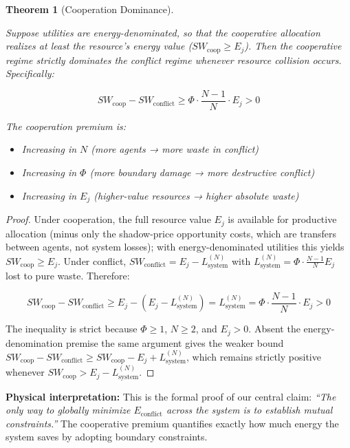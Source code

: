 \documentclass[11pt]{article}
\theoremstyle{plain}
\newtheorem{theorem}{Theorem}
\theoremstyle{definition}
\theoremstyle{remark}
\begin{document}
\begin{theorem}[Cooperation Dominance]
\label{thm-cooperation-dominance}

Suppose utilities are energy-denominated, so that the cooperative allocation realizes at least the resource's energy value ($SW_{\text{coop}} \geq E_j$). Then the cooperative regime strictly dominates the conflict regime whenever resource collision occurs. Specifically:

$$SW_{\text{coop}} - SW_{\text{conflict}} \geq \Phi \cdot \frac{N-1}{N} \cdot E_j > 0$$

The cooperation premium is:
\begin{itemize}
\item Increasing in $N$ (more agents → more waste in conflict)
\item Increasing in $\Phi$ (more boundary damage → more destructive conflict)
\item Increasing in $E_j$ (higher-value resources → higher absolute waste)
\end{itemize}

\end{theorem}

\begin{proof}
Under cooperation, the full resource value $E_j$ is available for productive allocation (minus only the shadow-price opportunity costs, which are transfers between agents, not system losses); with energy-denominated utilities this yields $SW_{\text{coop}} \geq E_j$. Under conflict, $SW_{\text{conflict}} = E_j - L_{\text{system}}^{(N)}$ with $L_{\text{system}}^{(N)} = \Phi \cdot \frac{N-1}{N} E_j$ lost to pure waste. Therefore:

$$SW_{\text{coop}} - SW_{\text{conflict}} \geq E_j - \left(E_j - L_{\text{system}}^{(N)}\right) = L_{\text{system}}^{(N)} = \Phi \cdot \frac{N-1}{N} \cdot E_j > 0$$

The inequality is strict because $\Phi \geq 1$, $N \geq 2$, and $E_j > 0$. Absent the energy-denomination premise the same argument gives the weaker bound $SW_{\text{coop}} - SW_{\text{conflict}} \geq SW_{\text{coop}} - E_j + L_{\text{system}}^{(N)}$, which remains strictly positive whenever $SW_{\text{coop}} > E_j - L_{\text{system}}^{(N)}$.
\end{proof}

\textbf{Physical interpretation:} This is the formal proof of our
central claim: \emph{``The only way to globally minimize
\(E_{\text{conflict}}\) across the system is to establish mutual
constraints.''} The cooperative premium quantifies exactly how much
energy the system saves by adopting boundary constraints.
\end{document}

